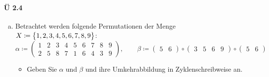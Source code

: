\documentclass{scrreprt}
\begin{document}
\paragraph{Ü 2.4}
\begin{enumerate}[(a)]
\item Betrachtet werden folgende Permutationen der Menge
  $X \coloneqq \qty\big{1, 2, 3, 4, 5, 6, 7, 8, 9}$:
  \[
    \alpha \coloneqq \begin{pmatrix}
      1 & 2 & 3 & 4 & 5 & 6 & 7 & 8 & 9 \\
      2 & 5 & 8 & 7 & 1 & 6 & 4 & 3 & 9
    \end{pmatrix}, \qquad \beta \coloneqq
    \begin{pmatrix} 5 & 6 \end{pmatrix} \circ
    \begin{pmatrix} 3 & 5 & 6 & 9 \end{pmatrix} \circ
    \begin{pmatrix} 5 & 6 \end{pmatrix}
  \]
  \begin{itemize}
  \item Geben Sie $\alpha$ und $\beta$ und ihre Umkehrabbildung in
    Zyklenschreibweise an.


\end{itemize}
\end{enumerate}
\end{document}
